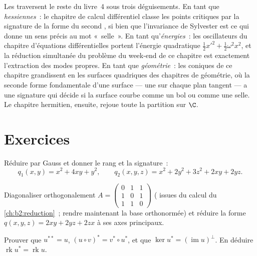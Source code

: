 \begin{remark}
Les  traversent le reste du livre~4 sous trois
déguisements. En tant que \emph{hessiennes}~: le chapitre de calcul
différentiel classe les points critiques par la signature de la
forme du second , si bien que l'invariance de Sylvester est ce
qui donne un sens précis au mot «~selle~». En tant
qu'\emph{énergies}~: les oscillateurs du chapitre d'équations
différentielles portent l'énergie quadratique $\frac12x'^2 +
\frac12\omega^2x^2$, et la réduction simultanée du problème du
week-end de ce chapitre est exactement l'extraction des modes
propres. En tant que \emph{géométrie}~: les coniques de ce chapitre
grandissent en les surfaces quadriques des chapitres de géométrie,
où la seconde forme fondamentale d'une surface --- une  sur chaque plan tangent --- a une signature qui décide
si la surface courbe comme un bol ou comme une selle. Le chapitre
hermitien, ensuite, rejoue toute la partition sur $\C$.
\end{remark}

\section{Exercices}

\begin{exercise}[$\star$]\label{exo:b2:quadratic:1}
Réduire par Gauss et donner le rang et la signature~:
\[
q_1(x,y) = x^2 + 4xy + y^2,
\qquad
q_2(x,y,z) = x^2 + 2y^2 + 3z^2 + 2xy + 2yz .
\]
\end{exercise}

\begin{exercise}[$\star$]\label{exo:b2:quadratic:2}
Diagonaliser orthogonalement $A = \begin{pmatrix} 0 & 1 & 1\\ 1 & 0 &
1\\ 1 & 1 & 0\end{pmatrix}$ ( issues du calcul du~
\cref{ch:b2:reduction}~; rendre maintenant la base orthonormée) et
réduire la forme $q(x,y,z) = 2xy + 2yz + 2zx$ à ses axes principaux.
\end{exercise}

\begin{exercise}[$\star$]\label{exo:b2:quadratic:3}
Prouver que $u^{**} = u$, $(u \circ v)^* = v^* \circ u^*$, et que
$\ker u^* = (\operatorname{im} u)^{\perp}$. En déduire
$\operatorname{rk} u^* = \operatorname{rk} u$.
\end{exercise}

